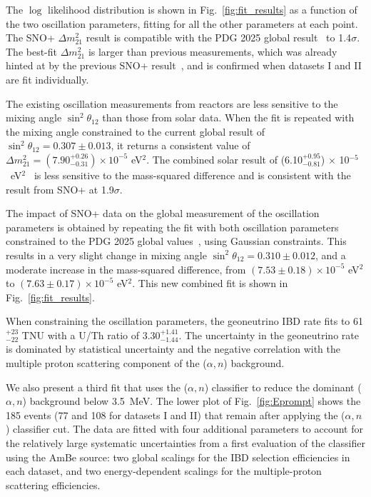 \documentclass[%
 reprint,
superscriptaddress,
 amsmath,amssymb,
 aps,
]{revtex4-2}
\newcommand{\alphan}{($\alpha, n$) }
\begin{document}
The $\log$ likelihood distribution is shown in Fig.~\ref{fig:fit_results} as a function of the two oscillation parameters, fitting for all the other parameters at each point. 
The SNO+ $\Delta m^2_{21}$ result is compatible with the PDG 2025 global result~\cite{PDG2025} to 1.4$\sigma$. 
The best-fit $\Delta m^2_{21}$ is larger than previous measurements, which was already hinted at by the previous SNO+ result~\cite{sno+ppo}, and is confirmed when datasets I and II are fit individually. 

The existing oscillation measurements from reactors are less sensitive to the mixing angle $\sin^2{\theta_{12}}$ than those from solar data. 
When the fit is repeated with the mixing angle constrained to the current global result of $\sin^2{\theta_{12}} = 0.307\pm0.013$, it returns a consistent value of $\Delta m^2_{21}=(7.90^{+0.26}_{-0.31})\times 10^{-5}$ eV$^2$. 
The combined solar result of (6.10$^{+0.95}_{-0.81}$) $\times$ 10$^{-5}$~eV$^2$~\cite{Super-Kamiokande_solar} is less sensitive to the mass-squared difference and is consistent with the result from SNO+ at 1.9$\sigma$. 

The impact of SNO+ data on the global measurement of the oscillation parameters is obtained by repeating the fit with both oscillation parameters constrained to the PDG 2025 global values~\cite{PDG2025}, using Gaussian constraints.
This results in a very slight change in mixing angle $\sin^2{\theta_{12}} = 0.310\pm0.012$, and a moderate increase in the mass-squared difference, from $(7.53\pm0.18) \times 10^{-5}$ eV$^2$ to $(7.63\pm0.17) \times 10^{-5}$ eV$^2$. 
This new combined fit is shown in Fig.~\ref{fig:fit_results}.  

When constraining the oscillation parameters, the geoneutrino IBD rate fits to 61$^{+23}_{-22}$ TNU with a U/Th ratio of $3.30^{+1.41}_{-1.44}$. 
The uncertainty in the geoneutrino rate is dominated by statistical uncertainty and the negative correlation with the multiple proton scattering component of the \alphan background. 

We also present a third fit that uses the \alphan classifier to reduce the dominant \alphan background below 3.5~MeV.  
The lower plot of Fig.~\ref{fig:Eprompt} shows the 185 events (77 and 108 for datasets I and II) that remain after applying the \alphan classifier cut.  The data are fitted with four additional parameters to account for the relatively large systematic uncertainties from a first evaluation of the classifier using the AmBe source: two global scalings for the IBD selection efficiencies in each dataset, and two energy-dependent scalings for the multiple-proton scattering efficiencies. 
\end{document}
